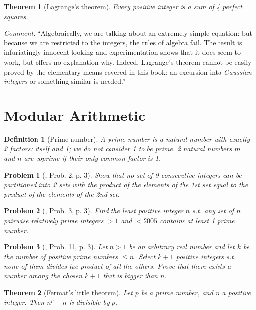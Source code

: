 \documentclass[oneside]{book}
\numberwithin{equation}{section}
\newtheorem{definition}{Definition}[section]
\newtheorem{theorem}{Theorem}[section]
\newtheorem{problem}{Problem}[section]
\begin{document}
\begin{theorem}[Lagrange's theorem]
	Every positive integer is a sum of 4 perfect squares.
\end{theorem}
\textit{Comment.} ``Algebraically, we are talking about an extremely simple equation: but because we are restricted to the integers, the rules of algebra fail. The result is infuriatingly innocent-looking and experimentation shows that it does seem to work, but offers no explanation why. Indeed, Lagrange's theorem cannot be easily proved by the elementary means covered in this book: an excursion into \textit{Gaussian integers} or something similar is needed.'' -- \cite[Chap. 2, p. 9]{Tao2006}

\section{Modular Arithmetic}
\begin{definition}[Prime number]
	A \emph{prime number} is a natural number with exactly 2 factors: itself and 1; we do not consider 1 to be prime. 2 natural numbers $m$ and $n$ are \emph{coprime} if their only common factor is 1.
\end{definition}

\begin{problem}[\cite{Gelca_Andreescu2017}, Prob. 2, p. 3]
	Show that no set of 9 consecutive integers can be partitioned into 2 sets with the product of the elements of the 1st set equal to the product of the elements of the 2nd set.
\end{problem}

\begin{problem}[\cite{Gelca_Andreescu2017}, Prob. 3, p. 3]
	Find the least positive integer $n$ s.t. any set of $n$ pairwise relatively prime integers $> 1$ and $< 2005$ contains at least 1 prime number.
\end{problem}

\begin{problem}[\cite{Gelca_Andreescu2017}, Prob. 11, p. 3]
	Let $n > 1$ be an arbitrary real number and let $k$ be the number of positive prime numbers $\le n$. Select $k + 1$ positive integers s.t. none of them divides the product of all the others. Prove that there exists a number among the chosen $k + 1$ that is bigger than $n$.
\end{problem}

\begin{theorem}[Fermat's little theorem]
	Let $p$ be a prime number, and $n$ a positive integer. Then $n^p - n$ is divisible by $p$.
\end{theorem}
\end{document}

